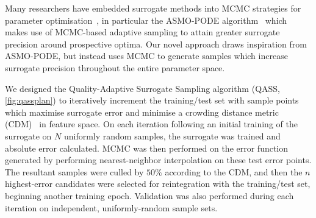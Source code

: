Many researchers have embedded surrogate methods into MCMC strategies for
parameter optimisation~\cite{Zhang2020,Gong2017}, in particular the ASMO-PODE
algorithm~\cite{Ginting2011} which makes use of MCMC-based adaptive sampling to
attain greater surrogate precision around prospective optima. Our novel approach
draws inspiration from ASMO-PODE, but instead uses MCMC to generate samples
which increase surrogate precision throughout the entire parameter space.


We designed the Quality-Adaptive Surrogate Sampling algorithm (QASS,
\cref{fig:qassplan}) to iteratively increment the training/test set with sample
points which maximise surrogate error and minimise a crowding distance metric
(CDM)~\cite{Solonen2012} in feature space. On each iteration following an initial training of the surrogate on $N$ uniformly random samples, the surrogate was trained and absolute error calculated. MCMC was then performed on the error function generated by performing nearest-neighbor interpolation on these test error points. The resultant samples were culled by $50\%$ according to the CDM, and then the $n$ highest-error candidates were selected for reintegration with the training/test set, beginning another training epoch. Validation was also performed during each iteration on independent, uniformly-random sample sets.





